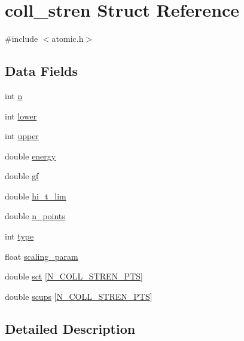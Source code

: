 \hypertarget{structcoll__stren}{}\section{coll\+\_\+stren Struct Reference}
\label{structcoll__stren}


{\ttfamily \#include $<$atomic.\+h$>$}

\subsection*{Data Fields}
\begin{DoxyCompactItemize}
\item 
int \hyperlink{structcoll__stren_a76775015376d278c2a22ba83cf58194a}{n}
\item 
int \hyperlink{structcoll__stren_a600da2dea449533e3d679bbd4deb5077}{lower}
\item 
int \hyperlink{structcoll__stren_a1a42740229c63647a0a0f2de0cc6ce9f}{upper}
\item 
double \hyperlink{structcoll__stren_a3d6d8ea6c2c8bfd55054bb5bca006b31}{energy}
\item 
double \hyperlink{structcoll__stren_afe2a6a375c336ec313cb748b838f792d}{gf}
\item 
double \hyperlink{structcoll__stren_a2d688f54546dfa04f6c9ac604f51c62d}{hi\+\_\+t\+\_\+lim}
\item 
double \hyperlink{structcoll__stren_a14153044993278f90042d070dc5ca206}{n\+\_\+points}
\item 
int \hyperlink{structcoll__stren_a292d3309ec1d6c9ae5f7afb2c401b162}{type}
\item 
float \hyperlink{structcoll__stren_a474f82a225f6408e53d005bcbb9e5099}{scaling\+\_\+param}
\item 
double \hyperlink{structcoll__stren_a867b1b9d0c751b4db6cd00b7ace4c6cd}{sct} \mbox{[}\hyperlink{atomic_8h_a83f9db7d66ceb630d0e4427329ae7d16}{N\+\_\+\+C\+O\+L\+L\+\_\+\+S\+T\+R\+E\+N\+\_\+\+P\+TS}\mbox{]}
\item 
double \hyperlink{structcoll__stren_af52c6023237c8ab4daff6f682ef01553}{scups} \mbox{[}\hyperlink{atomic_8h_a83f9db7d66ceb630d0e4427329ae7d16}{N\+\_\+\+C\+O\+L\+L\+\_\+\+S\+T\+R\+E\+N\+\_\+\+P\+TS}\mbox{]}
\end{DoxyCompactItemize}


\subsection{Detailed Description}


